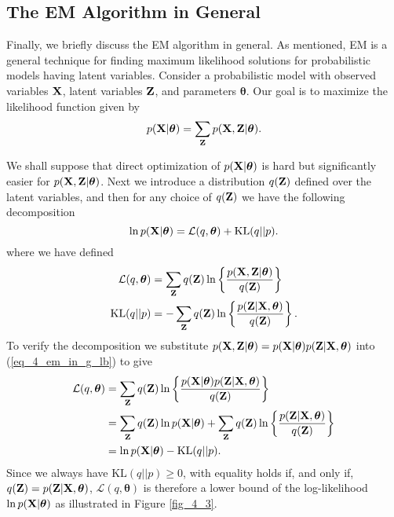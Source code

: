 \documentclass[../main.tex]{subfiles}
\begin{document}
\subsection{The EM Algorithm in General}\label{sec_4_EM_in_gen}
Finally, we briefly discuss the EM algorithm in general. As mentioned, EM is a general technique for finding maximum likelihood solutions for probabilistic models having latent variables. Consider a probabilistic model with observed variables ${\bf X}$, latent variables ${\bf Z}$, and parameters $\bm{\theta}$. Our goal is to maximize the likelihood function given by
\begin{equation*}
p({\bf X}|\bm{\theta}) = \sum_{{\bf Z}} p({\bf X,Z}|\bm{\theta}).
\end{equation*} 
\par We shall suppose that direct optimization of $p({\bf X}|\bm{\theta})$ is hard but significantly easier for $p({\bf X,Z}|\bm{\theta})$. Next we introduce a distribution $q({\bf Z})$ defined over the latent variables, and then for any choice of $q({\bf Z})$ we have the following decomposition
\begin{equation*}
\ln p({\bf X}|\bm{\theta}) = \mathcal{L}(q,\bm{\theta})+\text{KL}(q||p).
\end{equation*}
where we have defined
\begin{align}
\label{eq_4_em_in_g_lb} \mathcal{L}(q,\bm{\theta}) &= \sum_{\bf Z}q({\bf Z})\ln \left\{\frac{p({\bf X, Z}|\bm{\theta})}{q({\bf Z})} \right\}\\
\text{KL}(q||p)&= -\sum_{\bf Z}q({\bf Z})\ln \left\{\frac{p({\bf  Z}|{\bf X}, \bm{\theta})}{q({\bf Z})} \right\}.
\end{align}
To verify the decomposition we substitute $p({\bf X,Z}|\bm{\theta})=p({\bf X}|\bm{\theta})p({\bf Z}|{\bf X},\bm{\theta})$ into (\ref{eq_4_em_in_g_lb}) to give
\begin{align}
\mathcal{L}(q,\bm{\theta}) &= \sum_{\bf Z}q({\bf Z})\ln \left\{\frac{p({\bf X}|\bm{\theta})p({\bf Z}|{\bf X},\bm{\theta})}{q({\bf Z})} \right\} \notag\\
&= \sum_{\bf Z}q({\bf Z})\ln p({\bf X}|\bm{\theta}) + \sum_{\bf Z}q({\bf Z})\ln \left\{\frac{p({\bf  Z}|{\bf X}, \bm{\theta})}{q({\bf Z})} \right\}\notag\\
\label{eq_4_em_in_g_lbdcp} &= \ln p({\bf X}|\bm{\theta}) - \text{KL}(q||p).
\end{align}
Since we always have $\text{KL}(q||p)\geq 0$, with equality holds if, and only if, $q({\bf Z})=p({\bf Z}|{\bf X},\bm{\theta})$, $\mathcal{L}(q,\bm{\theta})$ is therefore a lower bound of the log-likelihood $ \ln p({\bf X}|\bm{\theta})$ as illustrated in Figure \ref{fig_4_3}.
\end{document}
